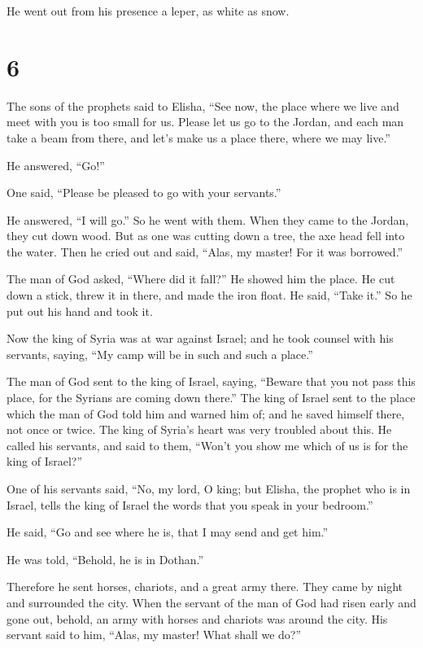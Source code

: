 He went out from his presence a leper, as white as snow.

\hypertarget{section-5}{%
\section{6}\label{section-5}}

 The sons of the prophets said to Elisha, ``See now, the
place where we live and meet with you is too small for us. 
Please let us go to the Jordan, and each man take a beam from there, and
let's make us a place there, where we may live.''

He answered, ``Go!''

 One said, ``Please be pleased to go with your servants.''

He answered, ``I will go.''  So he went with them. When they
came to the Jordan, they cut down wood.  But as one was
cutting down a tree, the axe head fell into the water. Then he cried out
and said, ``Alas, my master! For it was borrowed.''

 The man of God asked, ``Where did it fall?'' He showed him
the place. He cut down a stick, threw it in there, and made the iron
float.  He said, ``Take it.'' So he put out his hand and
took it.

 Now the king of Syria was at war against Israel; and he
took counsel with his servants, saying, ``My camp will be in such and
such a place.''

 The man of God sent to the king of Israel, saying, ``Beware
that you not pass this place, for the Syrians are coming down there.''
 The king of Israel sent to the place which the man of God
told him and warned him of; and he saved himself there, not once or
twice.  The king of Syria's heart was very troubled about
this. He called his servants, and said to them, ``Won't you show me
which of us is for the king of Israel?''

 One of his servants said, ``No, my lord, O king; but
Elisha, the prophet who is in Israel, tells the king of Israel the words
that you speak in your bedroom.''

 He said, ``Go and see where he is, that I may send and get
him.''

He was told, ``Behold, he is in Dothan.''

 Therefore he sent horses, chariots, and a great army
there. They came by night and surrounded the city.  When
the servant of the man of God had risen early and gone out, behold, an
army with horses and chariots was around the city. His servant said to
him, ``Alas, my master! What shall we do?''

